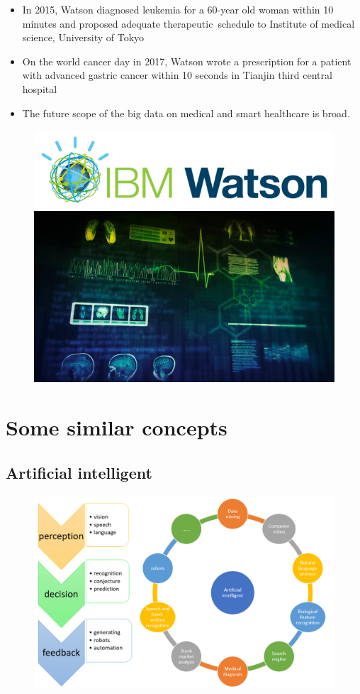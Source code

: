 \begin{itemize}
\item In 2015, Watson diagnosed leukemia for a 60-year old woman within 10 minutes and proposed adequate therapeutic schedule to Institute of medical science, University of Tokyo

\item On the world cancer day in 2017, Watson wrote a prescription for a patient with advanced gastric cancer within 10 seconds in Tianjin third central hospital

\item The future scope of the big data on medical and smart healthcare is broad.
\end{itemize}
\begin{figure}[H]
\centering
\includegraphics[width=.6\textwidth]{figures/Watson1}\\
\includegraphics[width=.6\textwidth]{figures/Watson2}
\end{figure}

\section{Some similar concepts}
\subsection{Artificial intelligent}
\begin{figure}[H]
\centering
\includegraphics[width=.9\textwidth]{figures/AI}
\end{figure}



